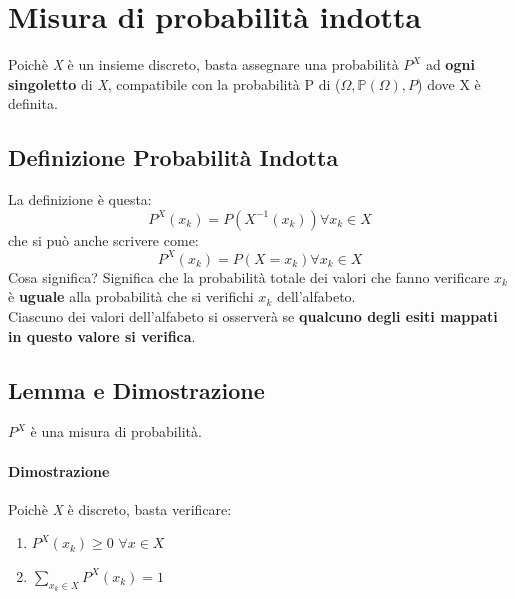 \documentclass{report}
\newcommand{\Pn}{\mathbb{P}}
\begin{document}
\section{Misura di probabilità indotta}
Poichè \textit{X} è un insieme discreto, basta assegnare una probabilità \(P^X\) ad \textbf{ogni singoletto} di \textit{X}, compatibile con la probabilità P di (\(\Omega, \Pn(\Omega), P\)) dove X è definita.
\subsection{Definizione Probabilità Indotta} La definizione è questa: \[P^X(x_k) = P(X^{-1}(x_k)) \forall x_k \in \textit{X}\] che si può anche scrivere come: \[P^X(x_k) = P(X = x_k) \forall x_k \in \textit{X}\]
Cosa significa? Significa che la probabilità totale dei valori che fanno verificare \(x_k\) è \textbf{uguale} alla probabilità che si verifichi \(x_k\) dell'alfabeto.\\
Ciascuno dei valori dell'alfabeto si osserverà se \textbf{qualcuno degli esiti mappati in questo valore si verifica}.
\subsection{Lemma e Dimostrazione} \(P^X\) è una misura di probabilità.
\paragraph{Dimostrazione} Poichè \textit{X} è discreto, basta verificare: \begin{enumerate}
    \item \(P^X (x_k) \geq 0\) \(\forall x \in \textit{X}\)
    \item \(\sum_{x_k \in \textit{X}}P^X (x_k) = 1\)
\end{enumerate}
\end{document}
